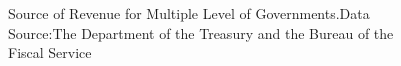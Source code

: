 \begin{figure}[H]
{\begin{minipage}{7cm}
        \end{minipage}
    }
    \caption[Source of Revenue for Multiple Level of Governments in 2019]{Source of Revenue for Multiple Level of Governments.Data Source:The Department of the Treasury and the Bureau of the Fiscal Service }    %
    \label{Figure 1.2}    %
\end{figure}



